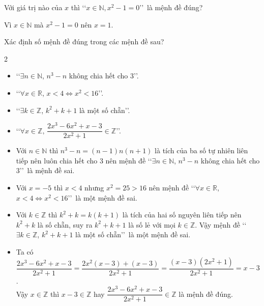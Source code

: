 \begin{ex}%
	Với giá trị nào của $x$ thì \lq\lq$x\in\mathbb{N}, x^2-1=0$\rq\rq~là mệnh đề đúng?
	\par
	\loigiai
	{Vì $x\in\mathbb{N}$ mà $x^2-1=0$ nên $x=1$.}
\end{ex}
\begin{ex}%
	Xác định số mệnh đề đúng trong các mệnh đề sau?
	\begin{multicols}{2}
		\begin{itemize}
			\item \lq\lq$\exists n\in \mathbb{N}$, $n^3-n$ không chia hết cho $3$\rq\rq.
			\item \lq\lq$\forall x\in \mathbb{R}$, $x<4\Leftrightarrow x^2<16$\rq\rq.
			\item \lq\lq$\exists k\in \mathbb{Z}$, $k^2+k+1$ là một số chẵn\rq\rq.
			\item \lq\lq$\forall x\in \mathbb{Z},\,\dfrac{2x^3-6x^2+x-3}{2x^2+1}\in \mathbb{Z}$\rq\rq.
		\end{itemize}
	\end{multicols}
	\par
	\loigiai
	{\begin{itemize}
	\item Với $n\in \mathbb{N}$ thì $n^3-n=(n-1)n(n+1)$ là tích của ba số tự nhiên liên tiếp nên luôn chia hết cho $3$ nên mệnh đề \lq\lq$\exists n\in \mathbb{N}$, $n^3-n$ không chia hết cho $3$\rq\rq~là mệnh đề sai.
	\item Với $x=-5$ thì $x<4$ nhưng $x^2=25>16$ nên mệnh đề \lq\lq$\forall x\in \mathbb{R}$, $x<4\Leftrightarrow x^2<16$\rq\rq~là một mệnh đề sai.
	\item Với $k\in \mathbb{Z}$ thì $k^2+k=k(k+1)$ là tích của hai số nguyên liên tiếp nên $k^2+k$ là số chẵn, suy ra $k^2+k+1$ là số lẻ với mọi $k\in \mathbb{Z}$. Vậy mệnh đề \lq\lq$\exists k\in \mathbb{Z}$, $k^2+k+1$ là một số chẵn\rq\rq~là một mệnh đề sai.
	\item Ta có $\dfrac{2x^3-6x^2+x-3}{2x^2+1}=\dfrac{2x^2(x-3)+(x-3)}{2x^2+1}=\dfrac{(x-3)(2x^2+1)}{2x^2+1}=x-3$.\\
	Vậy $x\in \mathbb{Z}$ thì $x-3\in \mathbb{Z}$ hay $\dfrac{2x^3-6x^2+x-3}{2x^2+1}\in \mathbb{Z}$ là mệnh đề đúng.
	\end{itemize}	}
\end{ex}
